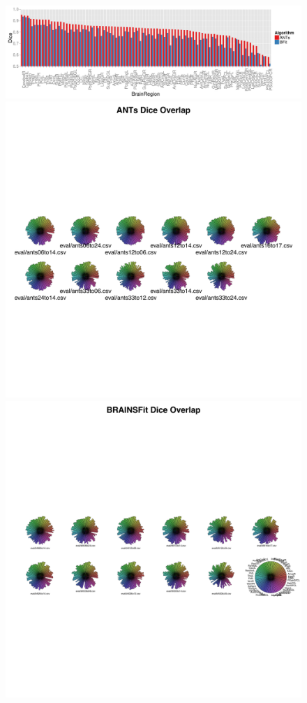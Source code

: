\documentclass{frontiersSCNS}
\begin{document}
\begin{figure}[t]
\begin{center}
\includegraphics[width=6in]{figs/barplot.pdf}
\includegraphics[width=6in]{figs/star_ants.pdf}
\includegraphics[width=6in]{figs/star_bfit.pdf}

\end{center}
\end{figure}
\end{document}
